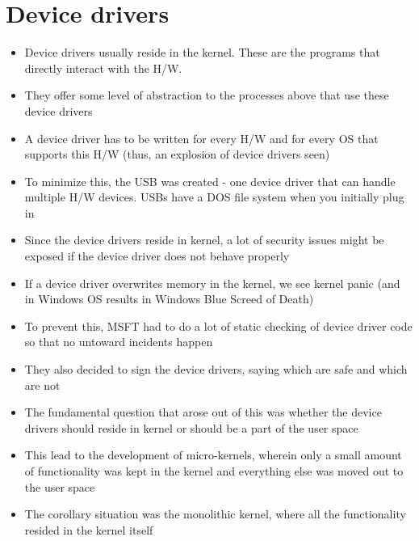 \documentclass[10pt]{article}
\begin{document}
\section{Device drivers}
\begin{itemize}
    \item Device drivers usually reside in the kernel. These are the programs that directly interact with the H/W. 
    \item They offer some level of abstraction to the processes above that use these device drivers
    \item A device driver has to be written for every H/W and for every OS that supports this H/W (thus, an explosion of device drivers seen)
    \item To minimize this, the USB was created - one device driver that can handle multiple H/W devices. USBs have a DOS file system when you initially plug in
    \item Since the device drivers reside in kernel, a lot of security issues might be exposed if the device driver does not behave properly
    \item If a device driver overwrites memory in the kernel, we see kernel panic (and in Windows OS results in Windows Blue Screed of Death)
    \item To prevent this, MSFT had to do a lot of static checking of device driver code so that no untoward incidents happen
    \item They also decided to sign the device drivers, saying which are safe and which are not
    \item The fundamental question that arose out of this was whether the device drivers should reside in kernel or should be a part of the user space
    \item This lead to the development of micro-kernels, wherein only a small amount of functionality was kept in the kernel and everything else was moved out to the user space
    \item The corollary situation was the monolithic kernel, where all the functionality resided in the kernel itself


\end{itemize}
\end{document}
